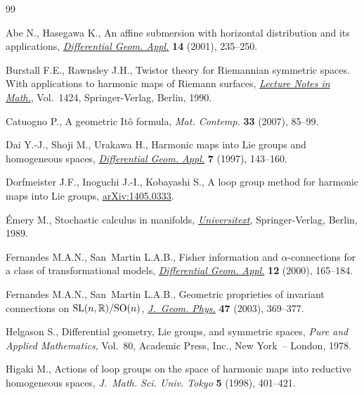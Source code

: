 \begin{thebibliography}{99}
\footnotesize \itemsep=-1pt

Abe N., Hasegawa K., An af\/f\/ine submersion with horizontal distribution and its
  applications, \href{http://dx.doi.org/10.1016/S0926-2245(01)00034-1}{\textit{Differential Geom. Appl.}} \textbf{14} (2001), 235--250.

Burstall F.E., Rawnsley J.H., Twistor theory for {R}iemannian symmetric spaces.
  With applications to harmonic maps of Riemann surfaces, \href{http://dx.doi.org/10.1007/BFb0095561}{\textit{Lecture Notes
  in Math.}}, Vol.~1424, Springer-Verlag, Berlin, 1990.

Catuogno P., A geometric {I}t\^o formula, \textit{Mat. Contemp.} \textbf{33}
  (2007), 85--99.

Dai Y.-J., Shoji M., Urakawa H., Harmonic maps into {L}ie groups and homogeneous
  spaces, \href{http://dx.doi.org/10.1016/S0926-2245(96)00045-9}{\textit{Differential Geom. Appl.}} \textbf{7} (1997), 143--160.

Dorfmeister J.F., Inoguchi J.-I., Kobayashi S., A loop group method for harmonic
  maps into Lie groups, \href{http://arxiv.org/abs/1405.0333}{arXiv:1405.0333}.

{\'E}mery M., Stochastic calculus in manifolds, \href{http://dx.doi.org/10.1007/978-3-642-75051-9}{\textit{Universitext}}, Springer-Verlag,
  Berlin, 1989.

Fernandes M.A.N., San~Martin L.A.B., Fisher information and
  {$\alpha$}-connections for a class of transformational models,
  \href{http://dx.doi.org/10.1016/S0926-2245(00)00010-3}{\textit{Differential Geom. Appl.}} \textbf{12} (2000), 165--184.

Fernandes M.A.N., San~Martin L.A.B., Geometric proprieties of invariant
  connections on {${\rm SL}(n,{\mathbb R})/{\rm SO}(n)$}, \href{http://dx.doi.org/10.1016/S0393-0440(02)00225-5}{\textit{J.~Geom.
  Phys.}} \textbf{47} (2003), 369--377.

Helgason S., Dif\/ferential geometry, {L}ie groups, and symmetric spaces,
  \textit{Pure and Applied Mathematics}, Vol.~80, Academic Press, Inc., New
  York~-- London, 1978.

Higaki M., Actions of loop groups on the space of harmonic maps into reductive
  homogeneous spaces, \textit{J.~Math. Sci. Univ. Tokyo} \textbf{5} (1998),
  401--421.


\end{thebibliography}
